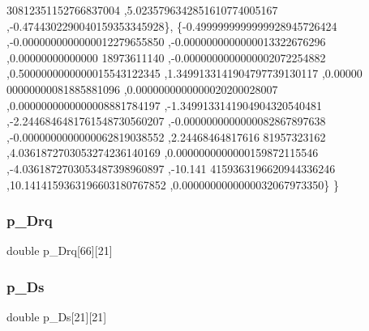 \begin{DoxyCode}
      30812351152766837004 ,5.0235796342851610774005167 ,-0.4744302290040159353345928\},
\{-0.4999999999999928945726424 ,-0.0000000000000012279655850 ,-0.0000000000000013322676296 ,0.00000000000000
      18973611140 ,-0.0000000000000002072254882 ,0.5000000000000015543122345 ,1.3499133141904797739130117 ,0.00000
      00000000081885881096 ,0.0000000000000020200028007 ,0.0000000000000008881784197 ,-1.3499133141904904320540481
       ,-2.2446846481761548730560207 ,-0.0000000000000082867897638 ,-0.0000000000000062819038552 ,2.24468464817616
      81957323162 ,4.0361872703053274236140169 ,0.0000000000000159872115546 ,-4.0361872703053487398960897 ,-10.141
      4159363196620944336246 ,10.1414159363196603180767852 ,0.0000000000000032067973350\}
\}
\end{DoxyCode}
\mbox{\label{a00999_abc2496260f080283715df33b388098f9}} 
\subsubsection{\texorpdfstring{p\+\_\+\+Drq}{p\_Drq}}
{\footnotesize\ttfamily double p\+\_\+\+Drq\mbox{[}66\mbox{]}\mbox{[}21\mbox{]}}

\mbox{\label{a00999_ae5879986c23478332a7ea6d4ec0bd535}} 
\subsubsection{\texorpdfstring{p\+\_\+\+Ds}{p\_Ds}}
{\footnotesize\ttfamily double p\+\_\+\+Ds\mbox{[}21\mbox{]}\mbox{[}21\mbox{]}}

